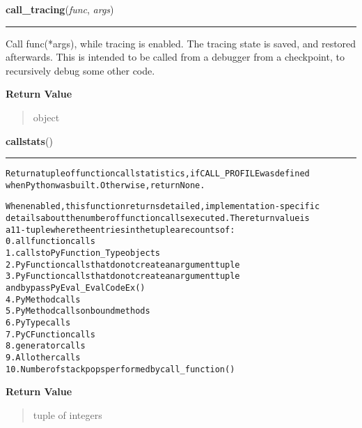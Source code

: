     \vspace{0.5ex}

\hspace{.8\funcindent}\begin{boxedminipage}{\funcwidth}

    \raggedright \textbf{call\_tracing}(\textit{func}, \textit{args})

    \vspace{-1.5ex}

    \rule{\textwidth}{0.5\fboxrule}
\setlength{\parskip}{2ex}
    Call func(*args), while tracing is enabled.  The tracing state is 
    saved, and restored afterwards.  This is intended to be called from a 
    debugger from a checkpoint, to recursively debug some other code.

\setlength{\parskip}{1ex}
      \textbf{Return Value}
    \vspace{-1ex}

      \begin{quote}
      object

      \end{quote}

    \end{boxedminipage}

    \label{sys:callstats}

    \vspace{0.5ex}

\hspace{.8\funcindent}\begin{boxedminipage}{\funcwidth}

    \raggedright \textbf{callstats}()

    \vspace{-1.5ex}

    \rule{\textwidth}{0.5\fboxrule}
\setlength{\parskip}{2ex}
\begin{alltt}
Return a tuple of function call statistics, if CALL\_PROFILE was defined
when Python was built.  Otherwise, return None.

When enabled, this function returns detailed, implementation-specific
details about the number of function calls executed. The return value is
a 11-tuple where the entries in the tuple are counts of:
0. all function calls
1. calls to PyFunction\_Type objects
2. PyFunction calls that do not create an argument tuple
3. PyFunction calls that do not create an argument tuple
   and bypass PyEval\_EvalCodeEx()
4. PyMethod calls
5. PyMethod calls on bound methods
6. PyType calls
7. PyCFunction calls
8. generator calls
9. All other calls
10. Number of stack pops performed by call\_function()
\end{alltt}

\setlength{\parskip}{1ex}
      \textbf{Return Value}
    \vspace{-1ex}

      \begin{quote}
      tuple of integers

      \end{quote}

    \end{boxedminipage}

